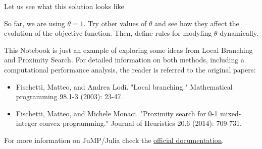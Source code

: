 \documentclass[11pt]{article}
\providecommand{\tightlist}{%
      \setlength{\itemsep}{0pt}\setlength{\parskip}{0pt}}
\begin{document}
    Let us see what this solution looks like

So far, we are using \(\theta = 1\). Try other values of \(\theta\) and
see how they affect the evolution of the objective function. Then,
define rules for modyfing \(\theta\) dynamically.

This Notebook is just an example of exploring some ideas from Local
Branching and Proximity Search. For detailed information on both
methods, including a computational performance analysis, the reader is
referred to the original papers:

\begin{itemize}
\tightlist
\item
  Fischetti, Matteo, and Andrea Lodi. "Local branching." Mathematical
  programming 98.1-3 (2003): 23-47.
\item
  Fischetti, Matteo, and Michele Monaci. "Proximity search for 0-1
  mixed-integer convex programming." Journal of Heuristics 20.6 (2014):
  709-731.
\end{itemize}

For more information on JuMP/Julia check the
\href{http://jump.readthedocs.io/en/latest/}{official documentation}.


    
    
    
    
\end{document}
